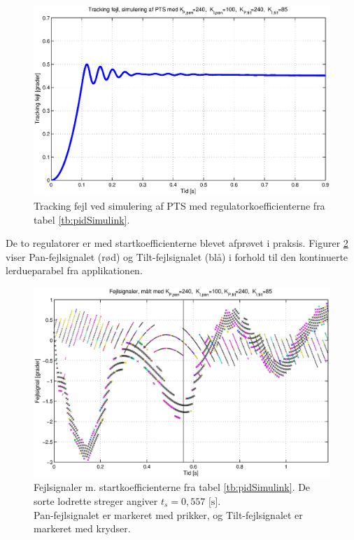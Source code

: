 \begin{figure}[h!]
\centering
\includegraphics[width=1\textwidth]{./graphics/pidSim1.eps}
\caption[Tracking fejl ved simulering]{Tracking fejl ved simulering af PTS med regulatorkoefficienterne fra tabel \ref{tb:pidSimulink}.} 
\label{fig:pidSim1}
\end{figure}

De to regulatorer er med startkoefficienterne blevet afprøvet i praksis.
Figurer \ref{fig:pidPhys1} viser Pan-fejlsignalet (rød) og Tilt-fejlsignalet (blå)
i forhold til den kontinuerte lerdueparabel fra applikationen.

\begin{figure}[h!]
\centering
\includegraphics[width=1\textwidth]{./graphics/pidPhys1.eps}
\caption[Fejlsignaler m. startkoefficienter]{Fejlsignaler m. startkoefficienterne fra tabel \ref{tb:pidSimulink}.
	De sorte lodrette streger angiver \(t_s=0,557 \text{ [s]}\).\\
	Pan-fejlsignalet er markeret med prikker, og Tilt-fejlsignalet er markeret med krydser.} 
\label{fig:pidPhys1}
\end{figure}

